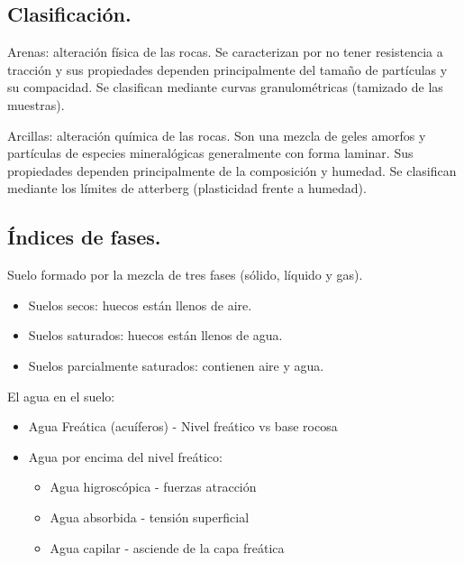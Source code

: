 \subsection{Clasificación.}
Arenas: alteración física de las rocas. Se caracterizan por no tener resistencia a tracción y sus propiedades dependen principalmente del tamaño de  partículas y su compacidad. Se clasifican mediante curvas granulométricas (tamizado de las muestras).

Arcillas: alteración química de las rocas. Son una mezcla de geles amorfos y partículas de especies mineralógicas generalmente con forma laminar. Sus propiedades dependen principalmente de la composición y humedad. Se clasifican mediante los límites de atterberg (plasticidad frente a humedad).

\subsection{Índices de fases.}
Suelo formado por la mezcla de tres fases (sólido, líquido y gas).
\begin{itemize}
    \item Suelos secos: huecos están llenos de aire.
    \item Suelos saturados: huecos están llenos de agua.
    \item Suelos parcialmente saturados: contienen aire y agua.
\end{itemize}

El agua en el suelo:
\begin{itemize}
    \item Agua Freática (acuíferos) - Nivel freático vs base rocosa
    \item Agua por encima del nivel freático:
    \begin{itemize}
        \item Agua higroscópica - fuerzas atracción
        \item Agua absorbida - tensión superficial
        \item Agua capilar - asciende de la capa freática
    \end{itemize}
\end{itemize}

